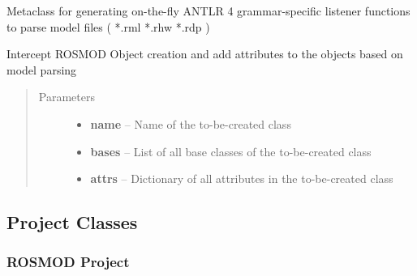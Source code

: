 \documentclass[letterpaper,10pt,english]{sphinxmanual}
\begin{document}
\begin{fulllineitems}
\label{class_Grammar_MetaClass:Grammar_MetaClass}
Metaclass for generating on-the-fly ANTLR 4 grammar-specific listener functions to parse model files ( *.rml \textbar{} *.rhw \textbar{} *.rdp )

\begin{fulllineitems}
\label{class_Grammar_MetaClass:Grammar_MetaClass.__new__}
Intercept ROSMOD Object creation and add attributes to the objects based on model parsing
\begin{quote}\begin{description}
\item[{Parameters}] \leavevmode\begin{itemize}
\item {} 
\textbf{name} -- Name of the to-be-created class

\item {} 
\textbf{bases} -- List of all base classes of the to-be-created class

\item {} 
\textbf{attrs} -- Dictionary of all attributes in the to-be-created class

\end{itemize}

\end{description}\end{quote}

\end{fulllineitems}


\end{fulllineitems}



\subsection{Project Classes}
\label{Library_Reference:project-classes}

\subsubsection{ROSMOD Project}
\label{class_Project::doc}\label{class_Project:rosmod-project}
\end{document}
